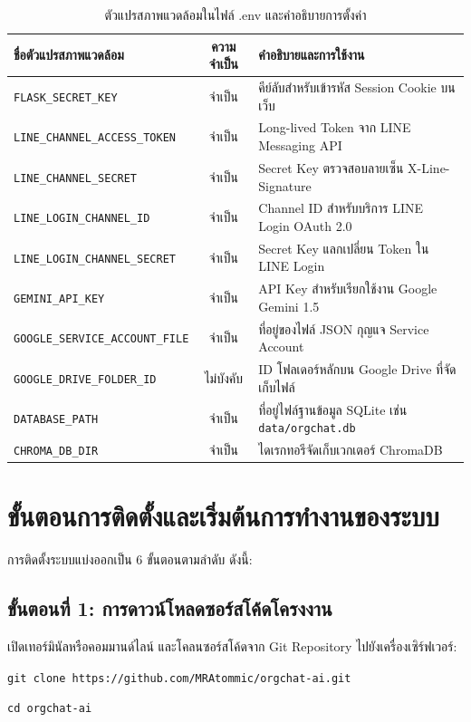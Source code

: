 \begin{table}[htbp]
\centering
\caption{ตัวแปรสภาพแวดล้อมในไฟล์ .env และคำอธิบายการตั้งค่า}
\label{tabA:env_vars}
\begin{tabularx}{\textwidth}{| L | c | L |}
\hline
\textbf{ชื่อตัวแปรสภาพแวดล้อม} & \textbf{ความจำเป็น} & \textbf{คำอธิบายและการใช้งาน} \\ \hline
\texttt{FLASK\_SECRET\_KEY} & จำเป็น & คีย์ลับสำหรับเข้ารหัส Session Cookie บนเว็บ \\ \hline
\texttt{LINE\_CHANNEL\_ACCESS\_TOKEN} & จำเป็น & Long-lived Token จาก LINE Messaging API \\ \hline
\texttt{LINE\_CHANNEL\_SECRET} & จำเป็น & Secret Key ตรวจสอบลายเซ็น X-Line-Signature \\ \hline
\texttt{LINE\_LOGIN\_CHANNEL\_ID} & จำเป็น & Channel ID สำหรับบริการ LINE Login OAuth 2.0 \\ \hline
\texttt{LINE\_LOGIN\_CHANNEL\_SECRET} & จำเป็น & Secret Key แลกเปลี่ยน Token ใน LINE Login \\ \hline
\texttt{GEMINI\_API\_KEY} & จำเป็น & API Key สำหรับเรียกใช้งาน Google Gemini 1.5 \\ \hline
\texttt{GOOGLE\_SERVICE\_ACCOUNT\_FILE} & จำเป็น & ที่อยู่ของไฟล์ JSON กุญแจ Service Account \\ \hline
\texttt{GOOGLE\_DRIVE\_FOLDER\_ID} & ไม่บังคับ & ID โฟลเดอร์หลักบน Google Drive ที่จัดเก็บไฟล์ \\ \hline
\texttt{DATABASE\_PATH} & จำเป็น & ที่อยู่ไฟล์ฐานข้อมูล SQLite เช่น \texttt{data/orgchat.db} \\ \hline
\texttt{CHROMA\_DB\_DIR} & จำเป็น & ไดเรกทอรีจัดเก็บเวกเตอร์ ChromaDB \\ \hline
\end{tabularx}
\end{table}

\section{ขั้นตอนการติดตั้งและเริ่มต้นการทำงานของระบบ}
\hspace*{1.3em}
การติดตั้งระบบแบ่งออกเป็น 6 ขั้นตอนตามลำดับ ดังนี้:

\subsection{ขั้นตอนที่ 1: การดาวน์โหลดซอร์สโค้ดโครงงาน}
\hspace*{1.3em}
เปิดเทอร์มินัลหรือคอมมานด์ไลน์ และโคลนซอร์สโค้ดจาก Git Repository ไปยังเครื่องเซิร์ฟเวอร์:
\begin{mycustomitem}
\item \texttt{git clone https://github.com/MRAtommic/orgchat-ai.git}
\item \texttt{cd orgchat-ai}
\end{mycustomitem}

